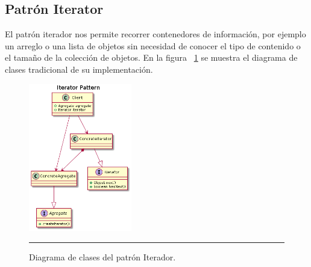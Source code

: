 \subsection{Patrón Iterator}
El patrón iterador nos permite recorrer contenedores de información, por ejemplo un arreglo o una lista de objetos sin necesidad de conocer el tipo de contenido o el tamaño de la colección de objetos. En la figura ~\ref{fig:uml_class_iterator} se muestra el diagrama de clases tradicional de su implementación.
\begin{figure}[htbp]
	\centering
	\includegraphics[width=0.4\textwidth]{Figures/uml_class_iterator.png}
	\rule{35em}{1pt}
	\caption[Iterator Class Diagram]{Diagrama de clases del patrón Iterador.}
	\label{fig:uml_class_iterator}
\end{figure}

